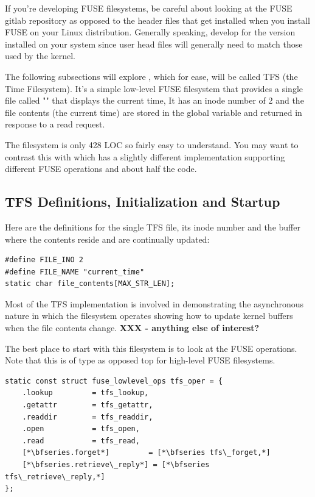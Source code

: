 \noindent
If you're developing FUSE filesystems, be careful about looking at the FUSE gitlab repository as opposed to the header files that get installed when you install FUSE on your Linux distribution. Generally speaking, develop for the version installed on your system since user head files will generally need to match those used by the kernel.

The following subsections will explore , which for ease, will be called TFS (the Time Filesystem). It's a simple low-level FUSE filesystem that provides a single file called "" that displays the current time, It has an inode number of 2 and the file contents (the current time) are stored in the global variable  and returned in response to a read request. 

The filesystem is only 428 LOC so fairly easy to understand. You may want to contrast this with  which has a slightly different implementation supporting different FUSE operations and about half the code.


\subsection{TFS Definitions, Initialization and Startup}

Here are the definitions for the single TFS file, its inode number and the buffer where the contents reside and are continually updated:

\begin{lstlisting}
#define FILE_INO 2
#define FILE_NAME "current_time"
static char file_contents[MAX_STR_LEN];
\end{lstlisting}

\noindent
Most of the TFS implementation is involved in demonstrating the asynchronous nature in which the filesystem operates showing how to update kernel buffers when the file contents change. \textbf{XXX - anything else of interest?} 

The best place to start with this filesystem is to look at the FUSE operations. Note that this is of type  as opposed top  for high-level FUSE filesystems.

\begin{lstlisting}
static const struct fuse_lowlevel_ops tfs_oper = {
    .lookup         = tfs_lookup,
    .getattr        = tfs_getattr,
    .readdir        = tfs_readdir,
    .open           = tfs_open,
    .read           = tfs_read, 
    [*\bfseries.forget*]         = [*\bfseries tfs\_forget,*]
    [*\bfseries.retrieve\_reply*] = [*\bfseries tfs\_retrieve\_reply,*]
};          
\end{lstlisting}

